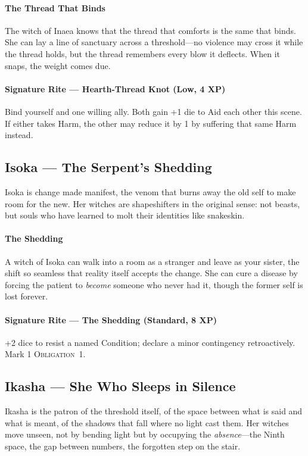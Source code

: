 \documentclass[11pt,letterpaper]{article}
\newcommand{\obligation}[1]{\textsc{Obligation}~#1}
\begin{document}
\paragraph{The Thread That Binds} The witch of Inaea knows that the thread that comforts is the same that binds. She can lay a line of sanctuary across a threshold---no violence may cross it while the thread holds, but the thread remembers every blow it deflects. When it snaps, the weight comes due.

\paragraph{Signature Rite --- Hearth-Thread Knot (Low, 4 XP)}
Bind yourself and one willing ally. Both gain +1 die to Aid each other this scene. If either takes Harm, the other may reduce it by 1 by suffering that same Harm instead.

\subsection{Isoka --- The Serpent's Shedding}

Isoka is change made manifest, the venom that burns away the old self to make room for the new. Her witches are shapeshifters in the original sense: not beasts, but souls who have learned to molt their identities like snakeskin.

\paragraph{The Shedding} A witch of Isoka can walk into a room as a stranger and leave as your sister, the shift so seamless that reality itself accepts the change. She can cure a disease by forcing the patient to \textit{become} someone who never had it, though the former self is lost forever.

\paragraph{Signature Rite --- The Shedding (Standard, 8 XP)}
+2 dice to resist a named Condition; declare a minor contingency retroactively. Mark 1 \obligation{1}.

\subsection{Ikasha --- She Who Sleeps in Silence}

Ikasha is the patron of the threshold itself, of the space between what is said and what is meant, of the shadows that fall where no light cast them. Her witches move unseen, not by bending light but by occupying the \textit{absence}---the Ninth space, the gap between numbers, the forgotten step on the stair.
\end{document}
